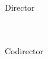 \begin{center}
    \textbf{\thesisTitle}
\end{center}

\vspace*{\fill}

\begin{center}
        \textbf{\thesisFirstAuthor}\\
        \textbf{\thesisSecondAuthor}
\end{center}

\vspace*{\fill}

\begin{center}
    \textbf{\thesisType}\\
\end{center}

\vspace*{\fill}

\begin{center}
    Director\\
    \textbf{\supervisorName}\\
    \textbf{\supervisorDetails}\\
\end{center}

\vspace*{\fill}

\begin{center}
    Codirector\\
    \textbf{\supervisorName}\\
    \textbf{\supervisorDetails}\\
\end{center}

\vspace*{\fill}

\begin{center}
    \textbf{\UNIVERSITY}\\
    \textbf{\FUPFACULTY}\\
    \textbf{\FUPPROGRAMME}\\
    \textbf{\thesisCity}\\
    \textbf{\thesisDate}
\end{center}